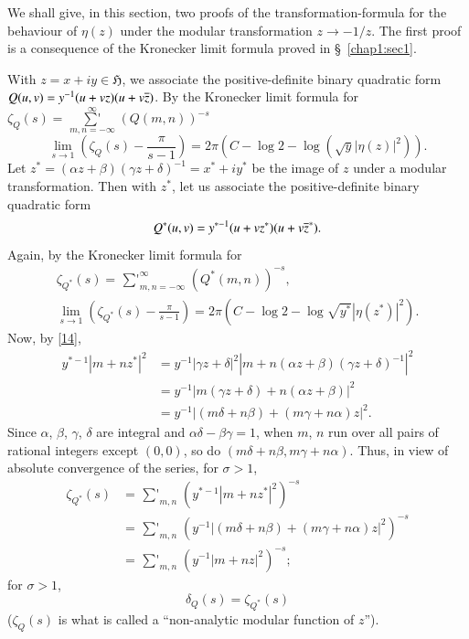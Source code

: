 We shall give, in this section, two proofs of the
transformation-formula for the behaviour of $\eta(z)$ under the
modular transformation $z\to -1/z$. The first proof is a consequence
of the Kronecker limit formula proved in \S\ \ref{chap1:sec1}.

With $z=x+iy\in\mathfrak{H}$, we associate the positive-definite
binary quadratic form $Q(u,v)=y^{-1}(u+vz)(u+v\overline{z})$. By the
Kronecker limit formula for
$\zeta_{Q}(s)=\mathop{{\sum}'}\limits^{\infty}_{m,n=-\infty}(Q(m,n))^{-s}$
\begin{equation*}
\lim\limits_{s\to
  1}\left(\zeta_{Q}(s)-\frac{\pi}{s-1}\right)=2\pi(C-\log
2-\log(\sqrt{y}|\eta(z)|^{2})).\tag{15}\label{15}
\end{equation*}
Let $z^{\ast}=(\alpha z+\beta)(\gamma
z+\delta)^{-1}=x^{\ast}+iy^{\ast}$ be the image of $z$ under a modular
transformation. Then with $z^{\ast}$, let us associate the
positive-definite binary quadratic form 
$$
Q^{\ast}(u,v)=y^{\ast-1}(u+vz^{\ast})(u+v\overline{z}^{\ast}).
$$\pageoriginale
Again, by the Kronecker limit formula for
\begin{gather*}
\zeta_{Q^{\ast}}(s)=\mathop{{\sum}'}^{\infty}_{m,n=-\infty}(Q^{\ast}(m,n))^{-s},\\
\lim\limits_{s\to
  1}\left(\zeta_{Q^{\ast}}(s)-\frac{\pi}{s-1}\right)=2\pi(C-\log
2-\log\sqrt{y^{\ast}}|\eta(z^{\ast})|^{2}).\tag{16}\label{16} 
\end{gather*}
Now, by \eqref{14},
\begin{align*}
y^{\ast-1}|m+nz^{\ast}|^{2} &= y^{-1}|\gamma z+\delta|^{2}|m+n(\alpha
z+\beta)(\gamma z+\delta)^{-1}|^{2}\\
&= y^{-1}|m(\gamma z+\delta)+n(\alpha z+\beta)|^{2}\\
&= y^{-1}|(m\delta+n\beta)+(m\gamma+n\alpha)z|^{2}. 
\end{align*}
Since $\alpha$, $\beta$, $\gamma$, $\delta$ are integral and
$\alpha\delta-\beta\gamma=1$, when $m$, $n$ run over all pairs of
rational integers except $(0,0)$, so do
$(m\delta+n\beta,m\gamma+n\alpha)$. Thus, in view of absolute
convergence of the series, for $\sigma>1$,
\begin{align*}
\zeta_{Q^{\ast}}(s) &=
\mathop{{\sum}'}_{m,n}(y^{\ast-1}|m+nz^{\ast}|^{2})^{-s}\\
&=
\mathop{{\sum}'}_{m,n}(y^{-1}|(m\delta+n\beta)+(m\gamma+n\alpha)z|^{2})^{-s}\\ 
&= \mathop{{\sum}'}_{m,n}(y^{-1}|m+nz|^{2})^{-s}; 
\end{align*}
\ie for $\sigma>1$,
$$
\delta_{Q}(s)=\zeta_{Q^{\ast}}(s)
$$
($\zeta_{Q}(s)$ is what is called a ``non-analytic modular function of
$z$'').


